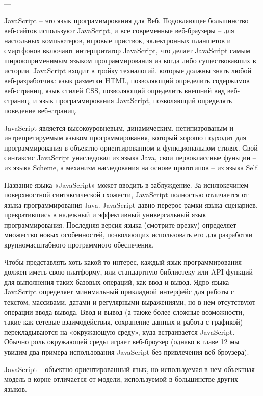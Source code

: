 ---




JavaScript -- это язык програмимрования для Веб. Подовляющее большинство веб-сайтов используют JavaScript, и все современные веб-браузеры -- для настольных компьютеров, игровые приствок, эклектронных планшетов и смартфонов включают интерпритатор JavaScript, что делает JavaScript самым широкоприменимым языком программирования из когда либо существовавших в истории. JavaScript входит в тройку техналогий, которые должны знать  любой веб-разработчик: язык разметки HTML, позволяющий определить содержимов веб-страниц, язык стилей CSS, позволяющий определить внешний вид веб-страниц, и язык программирования JavaScript, позволяющий определять поведение веб-страниц.

JavaScript является высокоуровневым, динамическим, нетипизрованым и интрепретируемым языком программирования, который хорошо подходит для программирования в объектно-ориентированном и функциональном стилях. Свой синтаксис JavaScript унаследовал из языка Java, свои первоклассные функции -- из языка Scheme, а механизм наследования на основе прототипов – из языка Self. 

Название языка «JavaScript» может вводить в заблуждение. За иснлюкечинем поверхностной синтаксической схожести, JavaScript полностью отличается от языка программирования Java. JavaScript давно перерос рамки языка сценариев, превратившись в надежный и эффективный универсальный язык программирования. Последняя версия языка (смотрите врезку) определяет множество новых особенностей, позволяющих использовать его для разработки крупномасштабного программного обеспечения.


Чтобы представлять хоть какой-то интерес, каждый язык программирования должен иметь свою платформу, или стандартную библиотеку или API функций для выполнения таких базовых операций, как ввод и  вывод. Ядро языка JavaScript определяет минимальный прикладной интерфейс для работы с текстом, массивами, датами и регулярными выражениями, но в нем отсутствуют операции ввода-вывода. Ввод и вывод (а также более сложные возможности, такие как сетевые взаимодействия, сохранение данных и работа с графикой) перекладываются на «окружающую среду», куда встраивается JavaScript. Обычно роль окружающей среды играет веб-броузер (однако в главе 12 мы увидим два примера использования JavaScript без привлечения веб-броузера).

JavaScript – объектно-ориентированный язык, но используемая в нем объектная модель в корне отличается от модели, используемой в большинстве других языков. 


